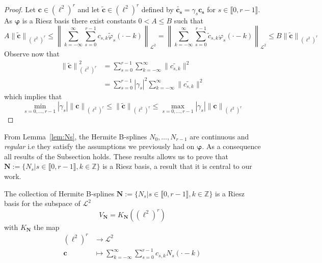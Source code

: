 \begin{proof}
  Let $\bm{c} \in {(\ell^2)}^r$ and let $\tilde{\bm{c}} \in {(\ell^2)}^r$ defined by $\tilde{\bm{c_s}} = \gamma_s 
  \bm{c_s}$ for $s \in \llbracket0,r-1\rrbracket$. As $\bm{\varphi}$ is a Riesz basis there exist constants $0 < A \leq 
  B$ such that
  \begin{equation*}
    A {\|\tilde{\bm{c}}\|}_{{(\ell^2)}^r}\leq {\left\| \sum_{k=-\infty}^{\infty} \sum_{s=0}^{r-1} c_{s,k} 
    \tilde{\varphi}_s(\cdot-k) \right\|}_{\mathcal{L}^2} = {\left\| \sum_{k=-\infty}^{\infty} \sum_{s=0}^{r-1} 
    \tilde{c}_{s,k} \varphi_s(\cdot-k) \right\|}_{\mathcal{L}^2} \leq B{\|\tilde{\bm{c}}\|}_{{(\ell^2)}^r}
  \end{equation*}
  Observe now that
  \begin{align*}
    {\|\tilde{\bm{c}}\|}_{{(\ell^2)}^r}^2 &= \sum_{s=0}^{r-1} \sum_{k=-\infty}^{\infty} \|\tilde{c_{s,k}}\|^2 \\
    &= \sum_{s=0}^{r-1} |\gamma_s|^2 \sum_{k=-\infty}^{\infty} \|\tilde{c_{s,k}}\|^2
  \end{align*}
  which implies that
  \begin{equation*}
    \min_{s=0, \ldots, r-1} |\gamma_s| {\|{\bm{c}}\|}_{{(\ell^2)}^r} \leq {\|\tilde{\bm{c}}\|}_{{(\ell^2)}^r}
   \leq \max_{s=0, \ldots, r-1} |\gamma_s| {\|{\bm{c}}\|}_{{(\ell^2)}^r}
  \end{equation*}
\end{proof}

From Lemma~\ref{lem:Ns}, the Hermite B-splines $N_0, \ldots, N_{r-1}$ are continuous and \emph{regular} i.e they satisfy 
the assumptions we previously had on $\bm{\varphi}$. As a consequence all results of the Subsection
holds. These results allows us to prove that $\bm{N} := \{N_{s}| s\in \llbracket0,r-1\rrbracket, k \in \mathbb{Z}\}$ is 
a Riesz basis, a result that it is central to our work.

\begin{thm}
  The collection of Hermite B-splines $\bm{N} := \{N_{s}| s\in \llbracket0,r-1\rrbracket, k \in \mathbb{Z}\}$ is a Riesz 
  basis for the subspace of $\mathcal{L}^2$
  \begin{equation*}
    V_{\bm{N}} = K_{\bm{N}}\left({(\ell^2)}^r\right)
  \end{equation*}
  with $K_{\bm{N}}$ the map
  \begin{align*}
    {(\ell^2)}^r & \longrightarrow  \mathcal{L}^2 \\
    \bm{c} & \longmapsto \sum_{k=-\infty}^{\infty} \sum_{s=0}^{r-1} c_{s,k} N_s(\cdot-k)
  \end{align*}
\end{thm}

